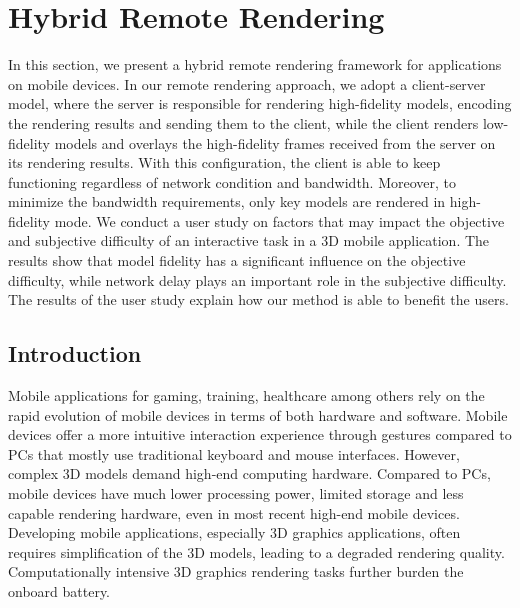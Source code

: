 \chapter{Hybrid Remote Rendering}
\label{chap:hrr}

In this section, we present a hybrid remote rendering framework for applications on mobile devices. In our remote rendering approach, we adopt a client-server model, where the server is responsible for rendering high-fidelity models, encoding the rendering results and sending them to the client, while the client renders low-fidelity models and overlays the high-fidelity frames received from the server on its rendering results. With this configuration, the client is able to keep functioning regardless of network condition and bandwidth. Moreover, to minimize the bandwidth requirements, only key models are rendered in high-fidelity mode. We conduct a user study on factors that may impact the objective and subjective difficulty of an interactive task in a 3D mobile application. The results show that model fidelity has a significant influence on the objective difficulty, while network delay plays an important role in the subjective difficulty. The results of the user study explain how our method is able to benefit the users.

\section{Introduction}
\label{sec:hrr:i}

Mobile applications for gaming, training, healthcare among others rely on the rapid evolution of mobile devices in terms of both hardware and software.
Mobile devices offer a more intuitive interaction experience through gestures 
compared to PCs that mostly use traditional keyboard and mouse interfaces.
However, complex 3D models demand high-end computing hardware. Compared to PCs, mobile devices have much lower processing power, limited storage and less capable rendering hardware, even in most recent high-end mobile devices.
Developing mobile applications, especially 3D graphics applications, often requires simplification of the 3D models, leading to a degraded rendering quality.
Computationally intensive 3D graphics rendering tasks further burden the onboard battery.

